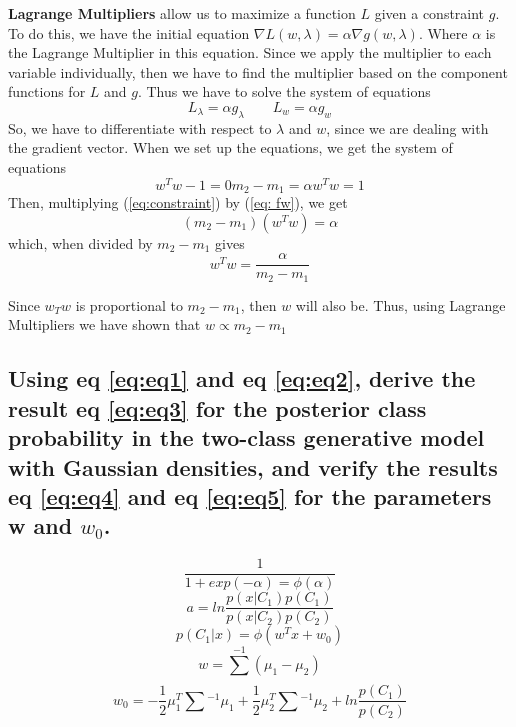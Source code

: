 \documentclass{article}
\begin{document}
		\textbf{Lagrange Multipliers} allow us to maximize a function $L$ given a constraint $g$.
		To do this, we have  the initial equation $\nabla L(w, \lambda) = \alpha \nabla g(w, \lambda)$. Where 
		$\alpha$ is the Lagrange Multiplier in this equation. Since we apply the multiplier to each
		variable individually, then we have to find the multiplier based on the component functions 
		for $L$ and $g$. Thus we have to solve the system of equations 
		\[ L_{\lambda} = \alpha g_{\lambda} \quad\quad L_{w} = \alpha g_{w} \]
		So, we have to differentiate with respect to $\lambda$ and $w$, since we are dealing with the gradient
		vector. When we set up the equations, we get the system of equations
		\begin{subequations}
			\begin{equation}
				w^{T}w -1 = 0
			\end{equation}
			\begin{equation}
				\label{eq: fw}
				m_{2} - m_{1} = \alpha
			\end{equation}
			\begin{equation}
				\label{eq:constraint}
				w^{T}w = 1
			\end{equation}
		\end{subequations}
		Then, multiplying (\ref{eq:constraint}) by (\ref{eq: fw}), we get
		\[(m_{2} - m_{1})(w^{T}w) = \alpha\]
		which, when divided by $m_{2} - m_{1}$ gives 
		\[w^{T}w = \frac{\alpha}{m_{2} - m_{1}}\]

		Since $w_{T}w$ is proportional to $m_{2} - m_{1}$, then $w$ will also be. 
		Thus, using Lagrange Multipliers we have shown that $w \propto m_{2} - m_{1}$ 
	\subsection{Using eq \ref{eq:eq1} and eq \ref{eq:eq2}, derive the result eq \ref{eq:eq3} for the posterior class
		probability in the two-class generative model with Gaussian densities, and verify the
		results eq \ref{eq:eq4} and eq \ref{eq:eq5} for the parameters w and $w_{0}$.}
		\begin{equation}
			\label{eq:eq1}
			\frac{1}{1 + exp(-\alpha) = \phi(\alpha)}
		\end{equation}
		\begin{equation}
			\label{eq:eq2}
			a = ln\frac{p(x|C_{1})p(C_{1})}{p(x|C_{2})p(C_{2})}	
		\end{equation}
		\begin{equation}
			\label{eq:eq3}
			p(C_{1}|x) = \phi(w^{T}x + w_{0})
		\end{equation}
		\begin{equation}
			\label{eq:eq4}
			w = \sum_{}^{-1}(\mu_{1} - \mu_{2})
		\end{equation}
		\begin{equation}
			\label{eq:eq5}
				w_{0} = -\frac{1}{2}\mu^{T}_{1}\sum_{}^{}^{-1}\mu_{1} + \frac{1}{2}\mu_{2}^{T}\sum_{}^{}^{-1}\mu_{2} + ln\frac{p(C_{1})}{p(C_{2})}
		\end{equation}
		
\end{document}
